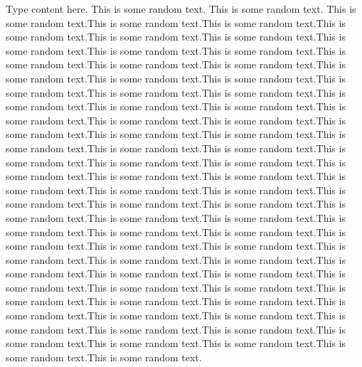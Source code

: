 Type content here. This is some random text. This is some random text. This is some random text.This is some random text.This is some random text.This is some random text.This is some random text.This is some random text.This is some random text.This is some random text.This is some random text.This is some random text.This is some random text.This is some random text.This is some random text.This is some random text.This is some random text.This is some random text.This is some random text.This is some random text.This is some random text.This is some random text.This is some random text.This is some random text.This is some random text.This is some random text.This is some random text.This is some random text.This is some random text.This is some random text.This is some random text.This is some random text.This is some random text.This is some random text.This is some random text.This is some random text.This is some random text.This is some random text.This is some random text.This is some random text.This is some random text.This is some random text.This is some random text.This is some random text.This is some random text.This is some random text.This is some random text.This is some random text.This is some random text.This is some random text.This is some random text.This is some random text.This is some random text.This is some random text.This is some random text.This is some random text.This is some random text.This is some random text.This is some random text.This is some random text.This is some random text.This is some random text.This is some random text.This is some random text.This is some random text.This is some random text.This is some random text.This is some random text.This is some random text.This is some random text.This is some random text.This is some random text.This is some random text.This is some random text.This is some random text.This is some random text.